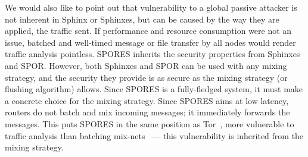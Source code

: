 We would also like to point out that
vulnerability to a global passive attacker is not inherent in Sphinx
or Sphinxes, but can be caused by the way they are applied, \ie the
traffic sent. If performance and resource consumption were not an
issue, batched and well-timed message or file transfer by all nodes
would render traffic analysis pointless. \Ac{SPORES} inherits the security properties from Sphinxes and \ac{SPOR}.
However, both Sphinxes and \ac{SPOR} can be used with any mixing strategy, and 
the security they provide is as secure as the mixing strategy (or flushing 
algorithm) allows.
Since \ac{SPORES} is a fully-fledged system, it must make a concrete choice for 
the mixing strategy.
Since \ac{SPORES} aims at low latency, routers do not batch and mix incoming 
messages; it immediately forwards the messages.
This puts \ac{SPORES} in the same position as Tor~\cite{Tor}, \ie more 
vulnerable to traffic analysis than batching 
mix-nets~\cite{RoutingSurveyAnonymousProtocols}  --- this vulnerability is inherited 
from the mixing strategy.





